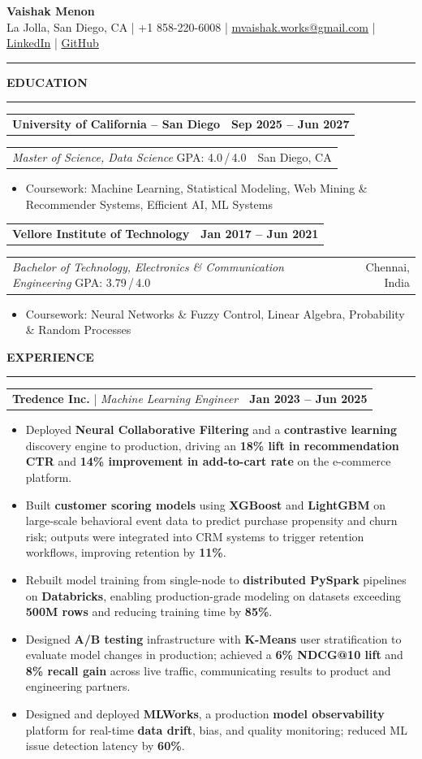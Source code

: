 \documentclass[10pt]{article}
\makeatletter
\newcommand{\resumesection}[1]{%
  \vspace{4pt}%
  {\bfseries\normalsize\MakeUppercase{#1}}\\[-2pt]
  \hrule
  \vspace{2pt}%
}
\newcommand{\resumeHeader}[2]{%
  \begin{center}
    {\LARGE \bfseries #1}\\[2pt]
    {\small #2}\\[-2pt]
  \end{center}
  \vspace{-2pt}
  \hrule
  \vspace{4pt}
}
\newcommand{\twoCol}[2]{%
  \begin{tabular*}{\textwidth}{@{\extracolsep{\fill}} l r}
    #1 & #2 \\
  \end{tabular*}
}
\newcommand{\bulletListStart}{\begin{itemize}[leftmargin=0.15in, labelsep=0.08in, itemsep=0pt, topsep=1pt, parsep=0pt, partopsep=0pt]}
\newcommand{\bulletListEnd}{\end{itemize}}
\makeatother
\begin{document}
\resumeHeader{Vaishak Menon}{La Jolla, San Diego, CA \;|\; +1 858-220-6008 \;|\;
  \href{mailto:mvaishak.works@gmail.com}{mvaishak.works@gmail.com} \;|\;
  \href{https://www.linkedin.com/in/m-vaishak-menon/}{LinkedIn} \;|\;
  \href{https://github.com/mvaishak}{GitHub}}
\small

\resumesection{Education}

\twoCol{\textbf{University of California -- San Diego}}{\textbf{Sep 2025 -- Jun 2027}}
\twoCol{\textit{Master of Science, Data Science} \quad GPA: 4.0\,/\,4.0}{San Diego, CA}
\bulletListStart
  \item Coursework: Machine Learning, Statistical Modeling, Web Mining \& Recommender Systems, Efficient AI, ML Systems
\bulletListEnd

\vspace{2pt}
\twoCol{\textbf{Vellore Institute of Technology}}{\textbf{Jan 2017 -- Jun 2021}}
\twoCol{\textit{Bachelor of Technology, Electronics \& Communication Engineering} \quad GPA: 3.79\,/\,4.0}{Chennai, India}
\bulletListStart
  \item Coursework: Neural Networks \& Fuzzy Control, Linear Algebra, Probability \& Random Processes
\bulletListEnd

\resumesection{Experience}

\twoCol{\textbf{Tredence Inc.} \;|\; \textit{Machine Learning Engineer}}{\textbf{Jan 2023 -- Jun 2025}}
\bulletListStart
  \item Deployed \textbf{Neural Collaborative Filtering} and a \textbf{contrastive learning} discovery engine to production, driving an \textbf{18\% lift in recommendation CTR} and \textbf{14\% improvement in add-to-cart rate} on the e-commerce platform.
  \item Built \textbf{customer scoring models} using \textbf{XGBoost} and \textbf{LightGBM} on large-scale behavioral event data to predict purchase propensity and churn risk; outputs were integrated into CRM systems to trigger retention workflows, improving retention by \textbf{11\%}.
  \item Rebuilt model training from single-node to \textbf{distributed PySpark} pipelines on \textbf{Databricks}, enabling production-grade modeling on datasets exceeding \textbf{500M rows} and reducing training time by \textbf{85\%}.
  \item Designed \textbf{A/B testing} infrastructure with \textbf{K-Means} user stratification to evaluate model changes in production; achieved a \textbf{6\% NDCG@10 lift} and \textbf{8\% recall gain} across live traffic, communicating results to product and engineering partners.
  \item Designed and deployed \textbf{MLWorks}, a production \textbf{model observability} platform for real-time \textbf{data drift}, bias, and quality monitoring; reduced ML issue detection latency by \textbf{60\%}.
\bulletListEnd
\end{document}
